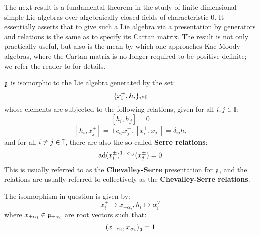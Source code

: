         The next result is a fundamental theorem in the study of finite-dimensional simple Lie algebras over algebraically closed fields of characteristic $0$. It essentially asserts that to give such a Lie algebra via a presentation by generators and relations is the same as to specify its Cartan matrix. The result is not only practically useful, but also is the mean by which one approaches Kac-Moody algebras, where the Cartan matrix is no longer required to be positive-definite; we refer the reader to \cite[Chapters 1-8]{kac_infinite_dimensional_lie_algebras} for details. 
        \begin{theorem} \label{theorem: serre_theorem_for_finite_dimensional_simple_lie_algebras}
            $\mathfrak{g}$ is isomorphic to the Lie algebra generated by the set:
                $$\{x_i^{\pm}, h_i\}_{i \in \mathbb{I}}$$
            whose elements are subjected to the following relations, given for all $i, j \in \mathbb{I}$:
                $$[h_i, h_j] = 0$$
                $$[h_i, x_j^{\pm}] = \pm c_{ij} x_j^{\pm}, [x_i^+, x_j^-] = \delta_{ij} h_i$$
            and for all $i \not = j \in \mathbb{I}$, there are also the so-called \textbf{Serre relations}:
                $$\mathrm{ad}(x_i^{\pm})^{1 - c_{ij}}(x_j^{\pm}) = 0$$
            This is usually referred to as the \textbf{Chevalley-Serre} presentation for $\mathfrak{g}$, and the relations are usually referred to collectively as the \textbf{Chevalley-Serre relations}.

            The isomorphism in question is given by:
                $$x_i^{\pm} \mapsto x_{\pm \alpha_i}, h_i \mapsto \alpha_i^{\vee}$$
            where $x_{\pm \alpha_i} \in \mathfrak{g}_{\pm \alpha_i}$ are root vectors such that:
                $$(x_{-\alpha_i}, x_{\alpha_i})_{\mathfrak{g}} = 1$$
        \end{theorem}

